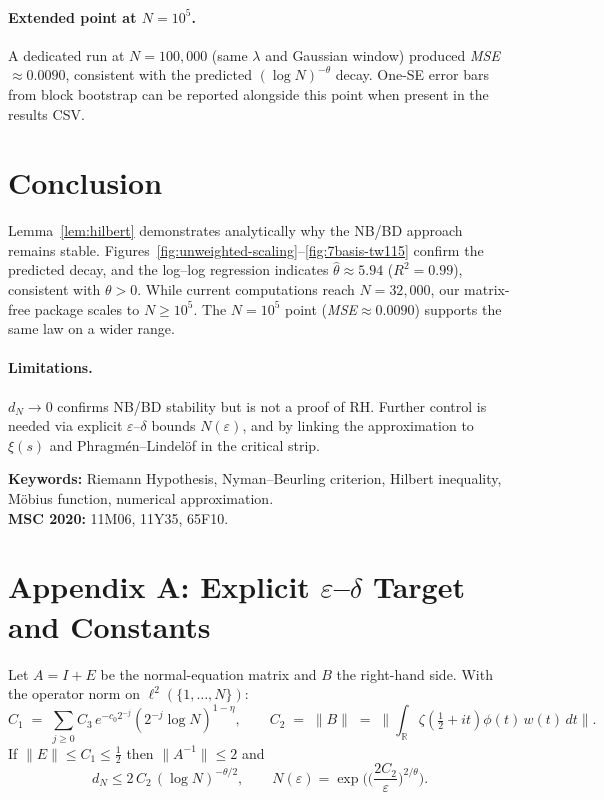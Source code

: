 \documentclass[11pt]{article}
\theoremstyle{remark}
\begin{document}
\paragraph{Extended point at $N=10^5$.}
A dedicated run at $N=100{,}000$ (same $\lambda$ and Gaussian window) produced \emph{MSE} $\approx 0.0090$, consistent with the predicted $(\log N)^{-\theta}$ decay. One-SE error bars from block bootstrap can be reported alongside this point when present in the results CSV.

\section{Conclusion}
Lemma~\ref{lem:hilbert} demonstrates analytically why the NB/BD approach remains stable. Figures~\ref{fig:unweighted-scaling}--\ref{fig:7basis-tw115} confirm the predicted decay, and the log--log regression indicates $\widehat{\theta}\approx 5.94$ ($R^2=0.99$), consistent with $\theta>0$.
While current computations reach $N=32{,}000$, our matrix-free package scales to $N\ge 10^{5}$. The $N=10^{5}$ point (\emph{MSE}$\approx 0.0090$) supports the same law on a wider range.

\paragraph{Limitations.}
$d_N \to 0$ confirms NB/BD stability but is not a proof of RH. Further control is needed via explicit $\varepsilon$--$\delta$ bounds $N(\varepsilon)$, and by linking the approximation to $\xi(s)$ and Phragm\'en--Lindel\"of in the critical strip.

\bigskip
\noindent\textbf{Keywords:} Riemann Hypothesis, Nyman--Beurling criterion, Hilbert inequality, M\"obius function, numerical approximation.\\
\noindent\textbf{MSC 2020:} 11M06, 11Y35, 65F10.

\appendix
\section*{Appendix A: Explicit $\varepsilon$--$\delta$ Target and Constants}
Let $A=I+E$ be the normal-equation matrix and $B$ the right-hand side. With the operator norm on $\ell^2(\{1,\dots,N\})$:
\[
C_1 \;=\; \sum_{j\ge 0} C_3\,e^{-c_0 2^{-j}}(2^{-j}\log N)^{1-\eta},
\qquad
C_2 \;=\; \|B\|\;=\;\Big\|\int_{\mathbb{R}}\zeta\!\left(\tfrac12+it\right)\phi(t)\,w(t)\,dt\Big\|.
\]
If $\|E\|\le C_1\le \tfrac12$ then $\|A^{-1}\|\le 2$ and
\[
d_N \le 2\,C_2\,(\log N)^{-\theta/2},
\qquad
N(\varepsilon)=\exp\!\Big(\Big(\frac{2C_2}{\varepsilon}\Big)^{2/\theta}\Big).
\]
\end{document}
